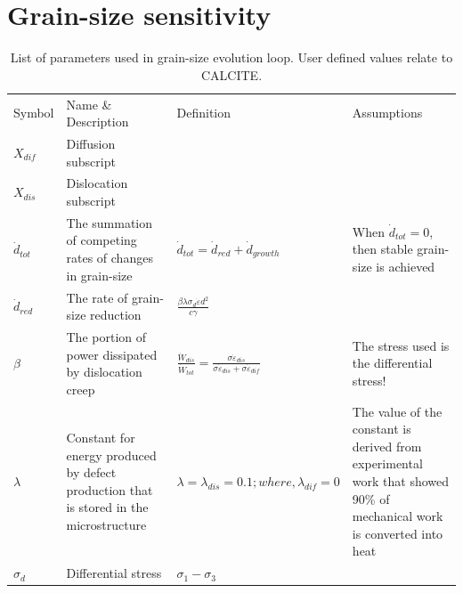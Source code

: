 \documentclass[]{scrreprt}
\begin{document}
\chapter{Grain-size sensitivity}
\label{chapter:size_sensitivity}

\begin{table}
\centering
\captionsetup{justification=centering, font=footnotesize}
  \caption[inline]{List of parameters used in grain-size evolution loop. User defined values relate to CALCITE.}
\label{tab:grain_evo_params}

\begin{tabular}{| L{1.3cm} | C{3.95cm} | C{5.25cm} | C{4.95cm} |}
\hline\noalign{\smallskip}
Symbol & Name \& Description & Definition & Assumptions \\
\noalign{\smallskip}\hline\noalign{\smallskip}

$X_{dif}$ & {\small Diffusion subscript} &  &  \\

$X_{dis}$ & {\small Dislocation subscript} &  &  \\

$\dot{d}_{tot}$ & {\small The summation of competing rates of changes in grain-size} & $\dot{d}_{tot} = \dot{d}_{red} + \dot{d}_{growth}$ & {\small When $\dot{d}_{tot} = 0$, then stable grain-size is achieved} \\

$\dot{d}_{red}$ & {\small The rate of grain-size reduction} & $\frac{\beta\lambda\sigma_{d}\dot{\varepsilon}d^2}{c\gamma}$ &  \\

$\beta$ & {\small The portion of power dissipated by dislocation creep} & $\frac{\dot{W}_{dis}}{\dot{W}_{tot}} = \frac{\sigma\dot{\varepsilon}_{dis}}{\sigma\dot{\varepsilon}_{dis} + \sigma\dot{\varepsilon}_{dif}}$ & {\small The stress used is the differential stress!} \\

$\lambda$ & {\small Constant for energy produced by defect production that is stored in the microstructure} & $\lambda=\lambda_{dis}= 0.1;  where,   \lambda_{dif} = 0$ & {\small The value of the constant is derived from experimental work that showed 90\% of mechanical work is converted into heat \citep{Austin2009}}\\

$\sigma_{d}$ & {\small Differential stress} & $\sigma_{1} - \sigma_{3}$ &  \\


\end{tabular}
\end{table}
\end{document}
